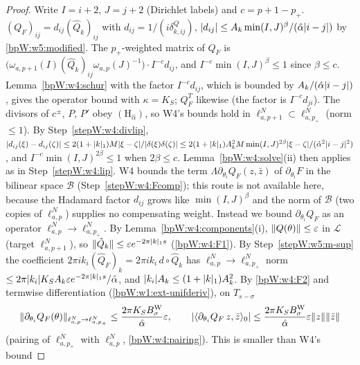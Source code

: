 \begin{proof}
Write $I=i+2$, $J=j+2$ (Dirichlet labels) and $c=p+1-p_+$.
\label{stepW:w5:m-sup} $(Q_F)_{ij}=d_{ij}(\hat Q_k)_{ij}$ with $d_{ij}=1/(i\delta^Q_{k,ij})$,
$\lvert d_{ij}\rvert\le A_k\min(I,J)^\beta/(\hat\alpha\lvert i-j\rvert)$ by \eqref{bpW:w5:modified}. The $p_+$-weighted matrix of
$Q_F$ is $\bigl(\omega_{a,p+1}(I)(\hat Q_k)_{ij}\omega_{a,p}(J)^{-1}\bigr)\cdot I^{-c}d_{ij}$, and
$I^{-c}\min(I,J)^\beta\le1$ since $\beta\le c$. Lemma~\ref{bpW:w4:schur} with the factor $I^{-c}d_{ij}$, which is bounded by
$A_k/(\hat\alpha\lvert i-j\rvert)$, gives the operator bound with $\kappa=K_S$; $Q_F^T$ likewise (the factor is $I^{-c}d_{ji}$).
\label{stepW:w5:m-other} The divisors of $c^\pm$, $P$, $P'$ obey $(\mathrm H_{\hat\alpha})$, so
W4's bounds hold in $\ell^N_{a,p+1}\subset\ell^N_{a,p_+}$ (norm $\le1$).
\label{stepW:w5:m-lip} By Step~\ref{stepW:w4:divlip},
$\lvert d_{ij}(\xi)-d_{ij}(\zeta)\rvert\le2(1+\lvert k\rvert_1)M\lvert \xi-\zeta\rvert/\lvert \delta(\xi)\delta(\zeta)\rvert
\le2(1+\lvert k\rvert_1)A_k^2M\min(I,J)^{2\beta}\lvert \xi-\zeta\rvert/(\hat\alpha^2\lvert i-j\rvert^2)$, and $I^{-c}\min(I,J)^{2\beta}\le1$ when
$2\beta\le c$. Lemma~\ref{bpW:w4:solve}(ii) then applies as in Step~\ref{stepW:w4:lip}.
\label{stepW:w5:m-act} W4 bounds the term $\Lambda\partial_{\theta_i}Q_F(z,\bar z)$ of
$\partial_{\theta_i}F$ in the bilinear space $\mathcal B$ (Step~\ref{stepW:w4:Fcomp}); this route is not available here, because
the Hadamard factor $d_{ij}$ grows like $\min(I,J)^\beta$ and the norm of $\mathcal B$ (two copies of $\ell^N_{a,p}$) supplies no
compensating weight. Instead we bound $\partial_{\theta_i}Q_F$ as an operator $\ell^N_{a,p}\to\ell^N_{a,p_+}$. By
Lemma~\ref{bpW:w4:components}(i), $\lVert Q(\theta)\rVert\le\varepsilon$ in $\mathcal L$ (target $\ell^N_{a,p+1}$), so
$\lVert \hat Q_k\rVert\le\varepsilon e^{-2\pi\lvert k\rvert_1s}$ (\ref{bpW:w4:F1}). By Step~\ref{stepW:w5:m-sup} the coefficient
$2\pi ik_i(\hat Q_F)_k=2\pi ik_i\,d\circ\hat Q_k$ has $\ell^N_{a,p}\to\ell^N_{a,p_+}$ norm
$\le2\pi\lvert k_i\rvert K_SA_k\varepsilon e^{-2\pi\lvert k\rvert_1s}/\hat\alpha$, and $\lvert k_i\rvert A_k\le(1+\lvert k\rvert_1)A_k^2$. By \ref{bpW:w4:F2} and
termwise differentiation (\ref{bpW:w1:ext-unifderiv}), on $T_{s-\sigma}$
\[\lVert \partial_{\theta_i}Q_F(\theta)\rVert_{\ell^N_{a,p}\to\ell^N_{a,p_+}}\le\frac{2\pi K_SB^{\rm W}_\sigma}{\hat\alpha}\varepsilon,\qquad
\lvert \langle\partial_{\theta_i}Q_F\,z,\bar z\rangle_0\rvert\le\frac{2\pi K_SB^{\rm W}_\sigma}{\hat\alpha}\varepsilon\lVert z\rVert\lVert \bar z\rVert\]
(pairing of $\ell^N_{a,p_+}$ with $\ell^N_{a,p}$, \eqref{bpW:w4:pairing}). This is smaller than W4's bound

\end{proof}

